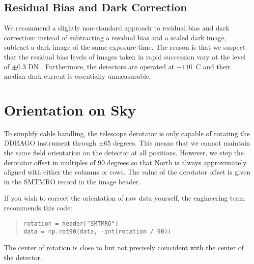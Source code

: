 \subsection{Residual Bias and Dark Correction}

We recommend a slightly non-standard approach to residual bias and dark correction: instead of subtracting a residual bias and a scaled dark image, subtract a dark image of the same exposure time. The reason is that we suspect that the residual bias levels of images taken in rapid succession vary at the level of $\pm 0.3$ DN \citep{ohp}. Furthermore, the detectors are operated at $-110$~C and their median dark current is essentially unmeasurable.

\section{Orientation on Sky}

To simplify cable handling, the telescope derotator is only capable of rotating the DDRAGO instrument through $\pm65$ degrees. This means that we cannot maintain the same field orientation on the detector at all positions. However, we step the derotator offset in multiples of 90 degrees so that North is always approximately aligned with either the columns or rows. The value of the derotator offset is given in the SMTMRO record in the image header.

If you wish to correct the orientation of raw data yourself, the engineering team recommends this code:
\begin{quote}\footnotesize\begin{verbatim}
rotation = header["SMTMRO"]
data = np.rot90(data, -int(rotation / 90))
\end{verbatim}\end{quote}

The center of rotation is close to but not precisely coincident with the center of the detector.


